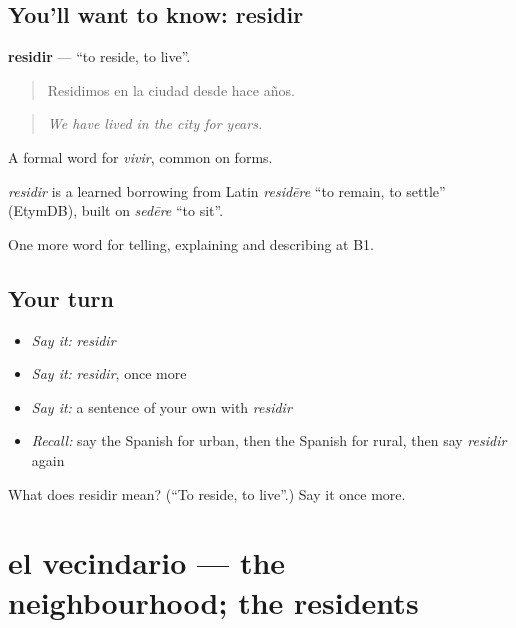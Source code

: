 \subsection*{You'll want to know: residir}
\textbf{residir} — \textquotedblleft{}to reside, to live\textquotedblright{}.

\begin{quote}
Residimos en la ciudad desde hace años.
\end{quote}

\begin{quote}
\emph{We have lived in the city for years.}
\end{quote}

A formal word for \emph{vivir}, common on forms.

\begin{cousinweb}
\emph{residir} is a learned borrowing from Latin \emph{residēre} \textquotedblleft{}to remain, to settle\textquotedblright{} (EtymDB), built on \emph{sedēre} \textquotedblleft{}to sit\textquotedblright{}.
\end{cousinweb}

\begin{grammarlens}[title={What you've built}]
One more word for telling, explaining and describing at B1.
\end{grammarlens}

\subsection*{Your turn}
\begin{itemize}
\raggedright
  \item \emph{Say it:} \emph{residir}
  \item \emph{Say it:} \emph{residir}, once more
  \item \emph{Say it:} a sentence of your own with \emph{residir}
  \item \emph{Recall:} say the Spanish for urban, then the Spanish for rural, then say \emph{residir} again
\end{itemize}

\begin{tcolorbox}[breakable,colback=teal!4,colframe=teal!35!black,title={Before you move on}]
What does residir mean? (\textquotedblleft{}To reside, to live\textquotedblright{}.) Say it once more.
\end{tcolorbox}
\section[el vecindario]{el vecindario — the neighbourhood; the residents}

